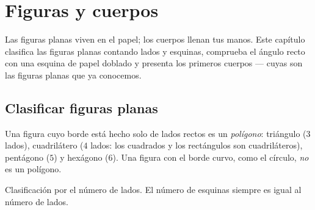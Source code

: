 \chapter{Figuras y cuerpos}\label{ch:g2:shapes}

Las figuras planas viven en el papel; los cuerpos llenan tus manos. Este capítulo
clasifica las figuras planas contando lados y esquinas, comprueba el ángulo
recto con una esquina de papel doblado y presenta los primeros cuerpos ---
cuyas  son las figuras planas que ya conocemos.

\section{Clasificar figuras planas}

\begin{definition}\label{def:g2:shapes:sort}
Una figura cuyo borde está hecho solo de lados rectos es un
\emph{polígono}: triángulo ($3$ lados), cuadrilátero ($4$ lados:
los cuadrados y los rectángulos son cuadriláteros), pentágono ($5$) y
hexágono ($6$). Una figura con el borde curvo, como el círculo,
\emph{no} es un polígono.
\end{definition}

\begin{omfigure}

{\small Clasificación por el número de lados. El número de esquinas siempre
es igual al número de lados.}
\end{omfigure}

